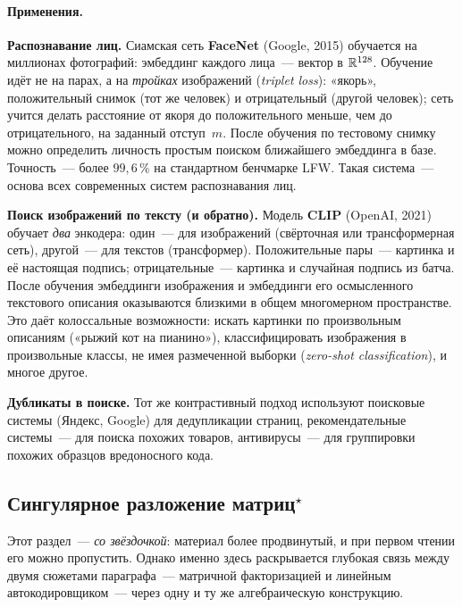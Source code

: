 \paragraph{Применения.}

\textbf{Распознавание лиц.} Сиамская сеть \textbf{FaceNet} (Google, 2015)
обучается на миллионах фотографий: эмбеддинг каждого лица~--- вектор в
$\mathbb{R}^{128}$. Обучение идёт не на парах, а на \emph{тройках} изображений
(\emph{triplet loss}): «якорь», положительный снимок (тот же человек) и
отрицательный (другой человек); сеть учится делать расстояние от якоря
до положительного меньше, чем до отрицательного, на заданный отступ~$m$. После обучения по
тестовому снимку можно определить личность простым поиском ближайшего
эмбеддинга в базе. Точность~--- более $99{,}6\,\%$ на стандартном
бенчмарке LFW. Такая система~--- основа всех современных систем
распознавания лиц.

\textbf{Поиск изображений по тексту (и обратно).} Модель \textbf{CLIP}
(OpenAI, 2021) обучает \emph{два} энкодера: один~--- для изображений
(свёрточная или трансформерная сеть), другой~--- для текстов
(трансформер). Положительные пары~--- картинка и её настоящая подпись;
отрицательные~--- картинка и случайная подпись из батча. После
обучения эмбеддинги изображения и эмбеддинги его осмысленного
текстового описания оказываются близкими в общем многомерном
пространстве. Это даёт колоссальные возможности: искать картинки по
произвольным описаниям («рыжий кот на пианино»), классифицировать
изображения в произвольные классы, не имея размеченной выборки
(\emph{zero-shot classification}), и многое другое.

\textbf{Дубликаты в поиске.} Тот же контрастивный подход используют
поисковые системы (Яндекс, Google) для дедупликации страниц,
рекомендательные системы~--- для поиска похожих товаров, антивирусы~---
для группировки похожих образцов вредоносного кода.

\subsection{Сингулярное разложение матриц\texorpdfstring{$^{\star}$}{}}
\label{ssec:svd}

Этот раздел~--- \emph{со звёздочкой}: материал более продвинутый, и при
первом чтении его можно пропустить. Однако именно здесь раскрывается
глубокая связь между двумя сюжетами параграфа~--- матричной
факторизацией и линейным автокодировщиком~--- через одну и ту же
алгебраическую конструкцию.

